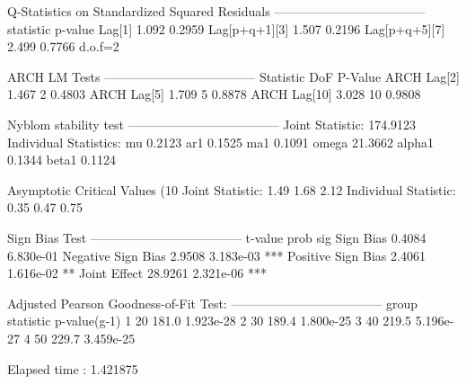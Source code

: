 \begin{Schunk}
\begin{Soutput}
Q-Statistics on Standardized Squared Residuals
------------------------------------
              statistic p-value
Lag[1]            1.092  0.2959
Lag[p+q+1][3]     1.507  0.2196
Lag[p+q+5][7]     2.499  0.7766
d.o.f=2

ARCH LM Tests
------------------------------------
             Statistic DoF P-Value
ARCH Lag[2]      1.467   2  0.4803
ARCH Lag[5]      1.709   5  0.8878
ARCH Lag[10]     3.028  10  0.9808

Nyblom stability test
------------------------------------
Joint Statistic:  174.9123
Individual Statistics:
mu      0.2123
ar1     0.1525
ma1     0.1091
omega  21.3662
alpha1  0.1344
beta1   0.1124

Asymptotic Critical Values (10%
Joint Statistic:     	 1.49 1.68 2.12
Individual Statistic:	 0.35 0.47 0.75

Sign Bias Test
------------------------------------
                   t-value      prob sig
Sign Bias           0.4084 6.830e-01
Negative Sign Bias  2.9508 3.183e-03 ***
Positive Sign Bias  2.4061 1.616e-02  **
Joint Effect       28.9261 2.321e-06 ***


Adjusted Pearson Goodness-of-Fit Test:
------------------------------------
  group statistic p-value(g-1)
1    20     181.0    1.923e-28
2    30     189.4    1.800e-25
3    40     219.5    5.196e-27
4    50     229.7    3.459e-25


Elapsed time : 1.421875
\end{Soutput}
\end{Schunk}

